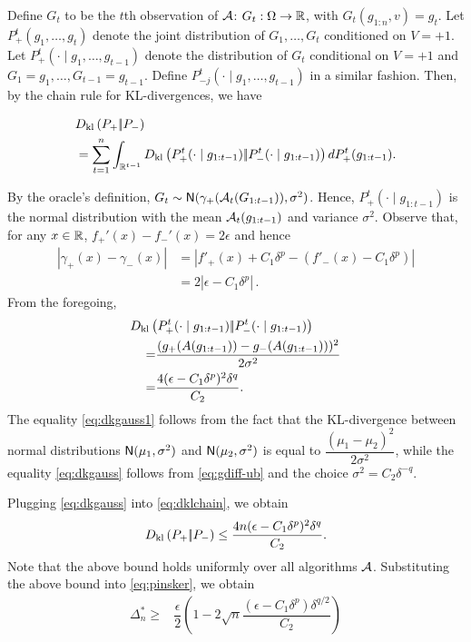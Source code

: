 Define $G_t$ to be the $t$th observation of $\mathcal{A}$: $G_t:\Omega \to \mathbb{R}$, with $G_t( g_{1:n}, v) = g_t$.
Let $P_+^t(g_1,\dots,g_t)$ denote the joint distribution of $G_1,\dots,G_t$ conditioned on $V=+1$.
Let $P_{+}^t(\cdot\mid g_1,\ldots,g_{t-1})$ denote the distribution of $G_t$ conditional on $V=+1$ and $G_1=g_1,\ldots,G_{t-1}=g_{t-1}$. Define  $P_{-j}^t(\cdot\mid g_1,\ldots,g_{t-1})$ in a similar fashion.
Then, by the chain rule for KL-divergences, we have
\begin{scriptsize}
\begin{align}
&D_{\rm kl}\left({P_{+}} |\!| {P_{-}} \right)\label{eq:dklchain}\\ 
&= \sum_{t=1}^n \int_{\mathbb{R}^{t-1}} D_{\rm kl}\left({P_{+}^t(\cdot\mid g_{1:t-1})} |\!| {P_{-}^t(\cdot\mid g_{1:t-1})} \right) d P_{+}^t( g_{1:t-1}).\nonumber
\end{align}
\end{scriptsize}
By the oracle's definition, $G_t \sim  \mathsf{N}(\gamma_{+}(\mathcal{A}_t(G_{1:t-1})),\sigma^2)$. Hence, 
$P_{+}^t(\cdot\mid g_{1:t-1})$ is the normal distribution with the mean $\mathcal{A}_t(g_{1:t-1})$ and variance $\sigma^2$.
Observe that, for any $x\in \mathbb{R}$, $f_+'(x) - f_-'(x) = 2\epsilon$ and hence
\begin{align}
 |\gamma_+(x) - \gamma_-(x)| 
& = | f'_+(x) + C_1 \delta^p - (f'_-(x)-C_1 \delta^p) | \nonumber \\
& = 2| \epsilon - C_1 \delta^p |\,.
 \label{eq:gdiff-ub}
\end{align}
From the foregoing, 
\begin{align}
 \MoveEqLeft \dkl{P_{+}^t(\cdot\mid g_{1:t-1})}{P_{-}^t(\cdot\mid g_{1:t-1})}\nonumber\\
 =&\dfrac{(g_{+}(A(g_{1:t-1})) - g_{-}(A(g_{1:t-1})))^2}{2 \sigma^2}\label{eq:dkgauss1}\\
 =& \dfrac{4(\epsilon-C_1\delta^p)^2\delta^q}{C_2}.\label{eq:dkgauss}
\end{align}
The equality \eqref{eq:dkgauss1} follows from the fact that the KL-divergence between normal distributions $\mathsf{N}(\mu_1,\sigma^2)$ and $\mathsf{N}(\mu_2,\sigma^2)$ is equal to $\dfrac{(\mu_1 - \mu_2)^2}{2 \sigma^2}$, while the equality \eqref{eq:dkgauss} follows from \eqref{eq:gdiff-ub} and the choice $\sigma^2 = C_2 \delta^{-q}$.

Plugging \eqref{eq:dkgauss} into \eqref{eq:dklchain}, we obtain
\begin{align}
D_{\rm kl}\left({P_{+}} |\!| {P_{-}} \right) \le \dfrac{4n(\epsilon-C_1\delta^p)^2 \delta^q}{C_2}.\label{eq:dkbd}
\end{align}
Note that the above bound holds uniformly over all algorithms $\mathcal{A}$. 
Substituting the above bound into \eqref{eq:pinsker}, we obtain 
\begin{align}
 \Delta_n^*
  \ge & \dfrac{\epsilon}{2} \left(1 - 2\sqrt{
    n}  \dfrac{(\epsilon-C_1\delta^p)\delta^{q/2}}{C_2}
  \right)\label{eq:final-lower-bd}
\end{align}

